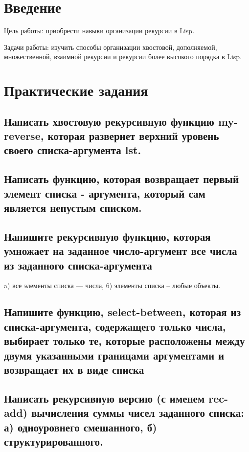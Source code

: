 \documentclass[a4paper, 14pt, unknownkeysallowed]{extreport}
\begin{document}

\setcounter{page}{2}

\chapter*{Введение}
Цель работы: приобрести навыки организации рекурсии в Lisp.

Задачи работы: изучить способы организации хвостовой, дополняемой, множественной,
взаимной рекурсии и рекурсии более высокого порядка в Lisp.

\chapter{Практические задания}

\section{ Написать хвостовую рекурсивную функцию my-reverse, которая развернет верхний 
	уровень своего списка-аргумента lst.}

\section{ Написать функцию, которая возвращает первый элемент списка - аргумента, который сам 
	является непустым списком.}


\section{Напишите рекурсивную функцию, которая умножает на заданное число-аргумент все 
	числа из заданного списка-аргумента}
a) все элементы списка --- числа,
6) элементы списка -- любые объекты.



\section{Напишите функцию, select-between, которая из списка-аргумента, содержащего только 
числа, выбирает только те, которые расположены между двумя указанными границами аргументами и возвращает их в виде списка }



\section{Написать рекурсивную версию (с именем rec-add) вычисления суммы чисел заданного списка:
	а) одноуровнего смешанного,
	б) структурированного.}


\end{document}
